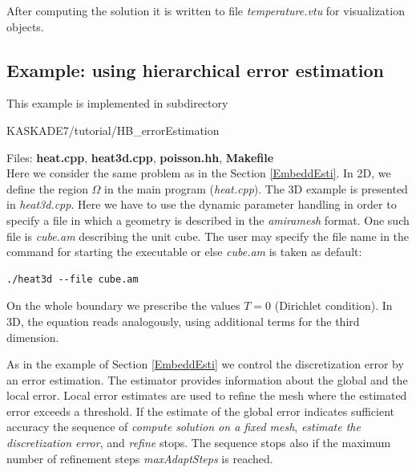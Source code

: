 \documentclass[11pt]{article}
\begin{document}
After computing the solution it is written to file {\em temperature.vtu} for
visualization objects.




\subsection{Example: using hierarchical error estimation}\label{HBesti}
This example is implemented in subdirectory 
\begin{center} KASKADE7/tutorial/HB\_errorEstimation\end{center}

\noindent Files: {\bf heat.cpp}, {\bf heat3d.cpp}, {\bf poisson.hh}, {\bf Makefile}\\

\noindent Here we consider the same problem as in the  Section \ref{EmbeddEsti}. 
In 2D, we define the region $\Omega$
in the main program ({\em heat.cpp}). The 3D example is presented in {\em heat3d.cpp}. Here
we have to use the dynamic parameter handling in order to specify a file in which a geometry
is described in the {\em amiramesh} format. One such file is {\em cube.am} describing the unit cube.
The user may specify the file name in the command for starting the executable or else {\em cube.am}
is taken as default:

\begin{scriptsize}
\begin{verbatim}
./heat3d --file cube.am
\end{verbatim}
\end{scriptsize}


On the whole boundary  we prescribe the values  $T=0$ (Dirichlet condition).
In 3D, the equation reads analogously, using additional terms for the third dimension.


As in the example  of Section \ref{EmbeddEsti} we  control the discretization error 
by an error estimation.
The estimator provides information about the global and the local error. Local error
estimates are used to refine the mesh where the estimated error exceeds a threshold.
If the estimate of the global error indicates sufficient accuracy the sequence of
{\em compute solution on a fixed mesh}, {\em estimate the discretization error}, and
{\em refine} stops. The sequence stops also if the maximum number of refinement 
steps {\em maxAdaptSteps} is reached.
\end{document}
